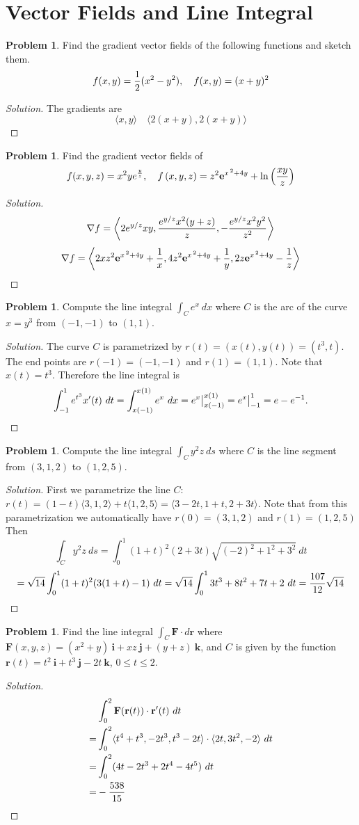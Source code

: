 \documentclass[12pt]{amsart}%
\theoremstyle{plain}
\theoremstyle{definition}
\newtheorem{prob}[theorem]{Problem}
\theoremstyle{special}
\newcommand{\sol}[1]{
{\begin{proof}[Solution]#1\end{proof}}
}
\newcommand{\Prob}[1]{\begin{tcolorbox}%
\begin{prob}
	#1
\end{prob}
\end{tcolorbox}	
}
\begin{document}
\section{Vector Fields and Line Integral}
\Prob{ Find the gradient vector fields of the following functions and sketch them.
\[f(x,y)={1\over 2}(x^2-y^2),\quad f(x,y)=(x+y)^2\]
}
\sol{The gradients are
\[\langle x,y\rangle \quad \langle 2(x+y),2(x+y)\rangle \]
}
\Prob{ Find the gradient vector fields of
\[f(x,y,z)=x^2ye^{y\over z},\quad  f\left( {x,y,z} \right) = {z^2}{{\bf{e}}^{{x^{\,2}} + 4y}} + \ln \left( {\frac{{xy}}{z}} \right)
 \]
}
\sol{
 \[\nabla f=\left\langle{2 e^{y/z} x y, {e^{y/z} x^2 (y + z)\over z}, -{e^{y/z} x^2 y^2\over z^2}}\right\rangle\]
 \[{\nabla f = \left\langle {2x{z^2}{{\bf{e}}^{{x^{\,2}} + 4y}} + \frac{1}{x},4{z^2}{{\bf{e}}^{{x^{\,2}} + 4y}} + \frac{1}{y},2z{{\bf{e}}^{{x^{\,2}} + 4y}} - \frac{1}{z}} \right\rangle }\qedhere\]
 }
 \Prob{ Compute the line integral $\displaystyle\int_C e^x\ dx$ where $C$ is the arc of the curve $x=y^3$ from $(-1,-1)$ to $(1,1)$.}
 \sol{The curve $C$ is parametrized by $r(t)=(x(t),y(t))=(t^3,t)$. The end points are $r(-1)=(-1,-1)$ and $r(1)=(1,1)$. Note that $x(t)=t^3$. Therefore the line integral is
 \[\int_{-1}^1 e^{t^3} x'(t)\ dt=\int_{x(-1)}^{x(1)}e^x \ dx=e^x\big|_{x(-1)}^{x(1)}=e^x\big|_{-1}^{1}=e-{e}^{-1}.\qedhere\]
 }\newpage
 \Prob{Compute the line integral $\displaystyle \int_C y^2z\ d s$ where $C$ is the line segment from $(3,1,2)$ to $(1,2,5)$.}
 
 \sol{
 First we parametrize the line $C$: $r(t)=(1-t)\langle3,1,2\rangle +t\langle 1,2,5\rangle =\langle 3-2t,1+t,2+3t\rangle$. Note that from this parametrization we automatically have $r(0)=(3,1,2)$ and $r(1)=(1,2,5)$ Then
 \[\int_C y^2z\ ds=\int_0^1(1+t)^2(2+3t)\sqrt{(-2)^2+1^2+3^2}\ dt\]
 \[=\sqrt{14}\int_0^1(1+t)^2(3(1+t)-1)\ dt=\sqrt{14}\int_0^1 3t^3+8t^2+7t+2\ dt={107\over 12}\sqrt{14}\qedhere\]
 }
\Prob{Find the line integral $\displaystyle\int_C\textbf{F}\cdot d\mathbf{r}$ where $\mathbf{F}(x,y,z)=(x^2+y)~\mathbf{i}+xz~\mathbf{j}+(y+z)~\mathbf{k}$, and $C$ is given by the function $\mathbf{r}(t)=t^2~\mathbf{i}+t^3~\mathbf{j}-2t~\mathbf{k}$, $0\leq t\leq 2$.}
\sol{
\begin{align*}
	&\int_0^2 \mathbf{F}(\mathbf{r}(t))\cdot \mathbf{r}'(t)\ dt\\
	=&\int_0^2 \langle t^4+t^3,-2t^3,t^3-2t \rangle\cdot \langle 2t,3t^2,-2\rangle\ dt\\
	=&\int_0^2 (4 t - 2 t^3 + 2 t^4 - 4 t^5) \ dt\\
	=&-{538\over 15}\qedhere
\end{align*}
}
\newpage
\end{document}
